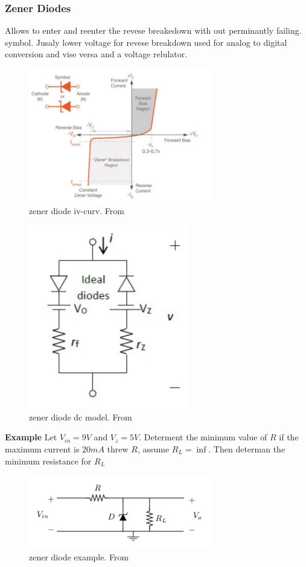 \subsubsection{Zener Diodes}
Allows to enter and reenter the revese breakedown with out perminantly failing.
symbol. Jusaly lower voltage for revese breakdown
used for analog to digital conversion and vise versa and a voltage relulator.
\begin{figure}[h]
    \centering
    \includegraphics[width=8cm]{image/zener-diode.png}
    \caption{zener diode iv-curv. From \cite{}}
\end{figure}

\begin{figure}[h]
    \centering
    \includegraphics[width=7cm]{image/zener_diode_dc.png}
    \caption{zener diode dc model. From \cite{}}
\end{figure}

\newpage
\textbf{Example}
Let $V_{in}=9V$ and $V_z=5V$. Determent the minimum value of $R$ if 
the maximum current is $20mA$ threw $R$, assume $R_L=\inf$. 
Then determan the minimum resistance for $R_L$
\begin{figure}[h]
    \vspace{10mm}
    \centering
    \includegraphics[width=8cm]{image/example_zener-diode.pdf}
    \caption{zener diode example. From \cite{}}
\end{figure}

